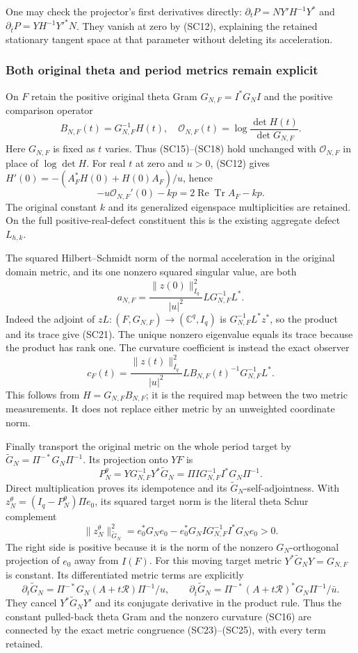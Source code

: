 One may check the projector's first derivatives directly:
$\partial_tP=NY'H^{-1}Y^*$ and
$\partial_{\bar t}P=YH^{-1}Y'^*N$.
They vanish at zero by (SC12), explaining the retained stationary
tangent space at that parameter without deleting its acceleration.

\subsubsection{Both original theta and period metrics remain explicit}

On $F$ retain the positive original theta Gram
$G_{N,F}=I^*G_NI$ and the positive comparison operator
\[
 B_{N,F}(t)=G_{N,F}^{-1}H(t),\quad
 \mathcal O_{N,F}(t)=\log\frac{\det H(t)}{\det G_{N,F}}.
 \tag{SC19}
\]
Here $G_{N,F}$ is fixed as $t$ varies.  Thus (SC15)--(SC18) hold
unchanged with $\mathcal O_{N,F}$ in place of $\log\det H$.
For real $t$ at zero and $u>0$, (SC12) gives
$H'(0)=-(A_F^*H(0)+H(0)A_F)/u$, hence
\[
 -u\mathcal O_{N,F}'(0)-kp
   =2\operatorname{Re}\operatorname{Tr}A_F-kp.
 \tag{SC20}
\]
The original constant $k$ and its generalized eigenspace multiplicities
are retained.  On the full positive-real-defect constituent this is
the existing aggregate defect $L_{h,k}$.

The squared Hilbert--Schmidt norm of the normal acceleration in the
original domain metric, and its one nonzero squared singular value,
are both
\[
 a_{N,F}=\frac{\|z(0)\|_{I_q}^2}{|u|^2}
              L G_{N,F}^{-1}L^*.
 \tag{SC21}
\]
Indeed the adjoint of $zL:(F,G_{N,F})\to(\mathbb C^q,I_q)$ is
$G_{N,F}^{-1}L^*z^*$, so the product and its trace give (SC21).
The unique nonzero eigenvalue equals its trace because the product
has rank one.  The curvature coefficient is instead the exact observer
\[
 c_F(t)=\frac{\|z(t)\|_{I_q}^2}{|u|^2}
       L B_{N,F}(t)^{-1}G_{N,F}^{-1}L^*.
 \tag{SC22}
\]
This follows from $H=G_{N,F}B_{N,F}$; it is the required map
between the two metric measurements.  It does not replace either
metric by an unweighted coordinate norm.

Finally transport the original metric on the whole period target by
$\widetilde G_N=\Pi^{-*}G_N\Pi^{-1}$.  Its projection onto $YF$ is
\[
 P_N^\theta
   =Y G_{N,F}^{-1}Y^*\widetilde G_N
   =\Pi I G_{N,F}^{-1}I^*G_N\Pi^{-1}.
 \tag{SC23}
\]
Direct multiplication proves its idempotence and its
$\widetilde G_N$-self-adjointness.  With
$z_N^\theta=(I_q-P_N^\theta)\Pi e_0$, its squared target norm is
the literal theta Schur complement
\[
 \|z_N^\theta\|_{\widetilde G_N}^2
   =e_0^*G_Ne_0-e_0^*G_NI G_{N,F}^{-1}I^*G_Ne_0>0.
 \tag{SC24}
\]
The right side is positive because it is the norm of the nonzero
$G_N$-orthogonal projection of $e_0$ away from $I(F)$.
For this moving target metric $Y^*\widetilde G_NY=G_{N,F}$ is
constant.  Its differentiated metric terms are explicitly
\[
 \partial_t\widetilde G_N
       =\Pi^{-*}G_N(A+t\mathcal R)\Pi^{-1}/u,
 \qquad
 \partial_{\bar t}\widetilde G_N
       =\Pi^{-*}(A+t\mathcal R)^*G_N\Pi^{-1}/\bar u.
 \tag{SC25}
\]
They cancel $Y^*\widetilde G_NY'$ and its conjugate derivative in
the product rule.  Thus the constant pulled-back theta Gram and the
nonzero curvature (SC16) are connected by the exact metric
congruence (SC23)--(SC25), with every term retained.

